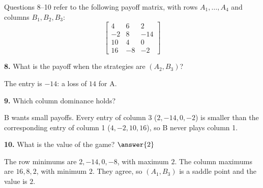 \documentclass[12pt]{ximera}
\begin{document}
\begin{problem}
Questions 8--10 refer to the following payoff matrix, with rows $A_1,\dots,A_4$ and columns
$B_1,B_2,B_3$:
\[
\begin{bmatrix} 4 & 6 & 2\\ -2 & 8 & -14\\ 10 & 4 & 0\\ 16 & -8 & -2 \end{bmatrix}
\]

\begin{prompt}
\textbf{8.} What is the payoff when the strategies are $(A_2,B_3)$?
\begin{multipleChoice}
\end{multipleChoice}
\begin{feedback}
The entry is $-14$: a loss of $14$ for A.
\end{feedback}
\end{prompt}

\begin{prompt}
\textbf{9.} Which column dominance holds?
\begin{multipleChoice}
\end{multipleChoice}
\begin{feedback}
B wants small payoffs. Every entry of column 3 ($2,-14,0,-2$) is smaller than the
corresponding entry of column 1 ($4,-2,10,16$), so B never plays column 1.
\end{feedback}
\end{prompt}

\begin{prompt}
\textbf{10.} What is the value of the game? $\answer{2}$
\begin{feedback}
The row minimums are $2,-14,0,-8$, with maximum $2$. The column maximums are $16,8,2$, with
minimum $2$. They agree, so $(A_1,B_3)$ is a saddle point and the value is $2$.
\end{feedback}
\end{prompt}
\end{problem}
\end{document}

